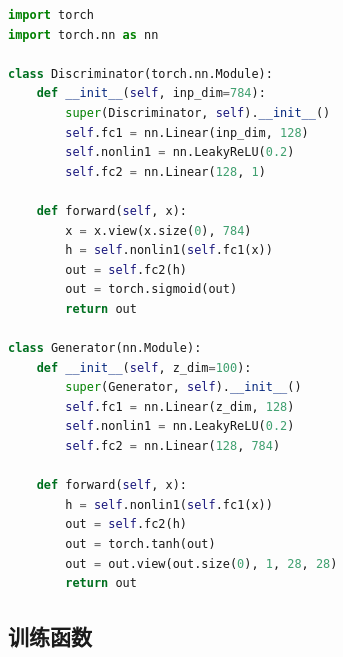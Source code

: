 \documentclass[a4paper]{article}
\begin{document}
\begin{lstlisting}[language=Python, caption=判别器和生成器定义]
import torch
import torch.nn as nn

class Discriminator(torch.nn.Module):
    def __init__(self, inp_dim=784):
        super(Discriminator, self).__init__()
        self.fc1 = nn.Linear(inp_dim, 128)
        self.nonlin1 = nn.LeakyReLU(0.2)
        self.fc2 = nn.Linear(128, 1)

    def forward(self, x):
        x = x.view(x.size(0), 784)
        h = self.nonlin1(self.fc1(x))
        out = self.fc2(h)
        out = torch.sigmoid(out)
        return out

class Generator(nn.Module):
    def __init__(self, z_dim=100):
        super(Generator, self).__init__()
        self.fc1 = nn.Linear(z_dim, 128)
        self.nonlin1 = nn.LeakyReLU(0.2)
        self.fc2 = nn.Linear(128, 784)

    def forward(self, x):
        h = self.nonlin1(self.fc1(x))
        out = self.fc2(h)
        out = torch.tanh(out)
        out = out.view(out.size(0), 1, 28, 28)
        return out
\end{lstlisting}

\subsection{训练函数}
\end{document}
